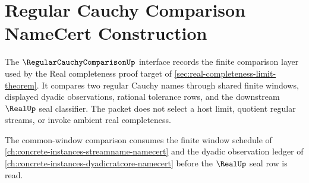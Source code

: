 \chapter{Regular Cauchy Comparison NameCert Construction}
\label{ch:concrete-instances-regular-cauchy-comparison-namecert}

The $\RegularCauchyComparisonUp$ interface records the finite comparison layer used by the Real completeness proof target of \autoref{sec:real-completeness-limit-theorem}. It compares two regular Cauchy names through shared finite windows, displayed dyadic observations, rational tolerance rows, and the downstream $\RealUp$ seal classifier. The packet does not select a host limit, quotient regular streams, or invoke ambient real completeness.

The common-window comparison consumes the finite window schedule of \autoref{ch:concrete-instances-streamname-namecert} and the dyadic observation ledger of \autoref{ch:concrete-instances-dyadicratcore-namecert} before the $\RealUp$ seal row is read.

